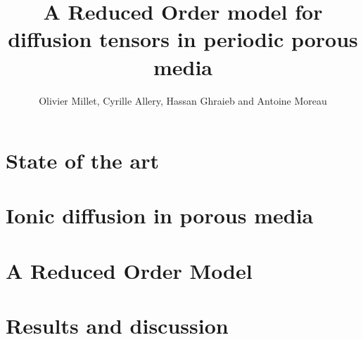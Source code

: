 \documentclass[a4paper,10pt]{article}
\title{A Reduced Order model for diffusion tensors in periodic porous media}
\author{Olivier Millet, Cyrille Allery, Hassan Ghraieb and Antoine Moreau}
\begin{document}

\maketitle

\begin{abstract}

\end{abstract}

%
\section{State of the art}\label{st_a}


\section{Ionic diffusion in porous media}\label{hom_d}


\section{A Reduced Order Model}\label{rom}


%

\section{Results and discussion}\label{res}



%



\end{document}
